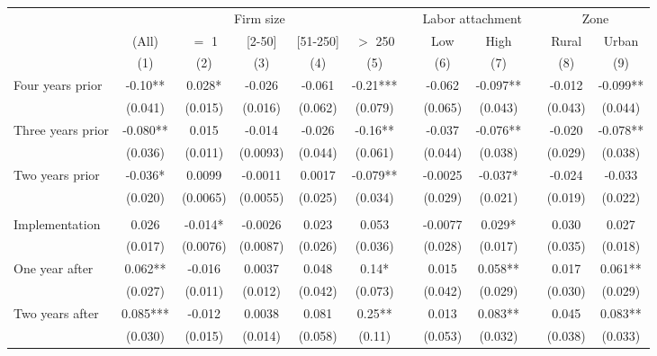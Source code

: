 \begin{tabular}{lccccccccccc}
\toprule
      & \multicolumn{5}{c}{Firm size}         &       & \multicolumn{2}{c}{Labor attachment} &       & \multicolumn{2}{c}{Zone} \\
\cmidrule{2-6}\cmidrule{8-9}\cmidrule{11-12}      & (All) & $=$ 1 & [2-50] & [51-250] & $>$ 250 &       & Low   & High  &       & Rural & Urban \\
\midrule
      & (1)   & (2)   & (3)   & (4)   & (5)   &       & (6)   & (7)   &       & (8)   & (9) \\
\midrule
\midrule
Four years prior & -0.10** & 0.028* & -0.026 & -0.061 & -0.21*** &       & -0.062 & -0.097** &       & -0.012 & -0.099** \\
      & (0.041) & (0.015) & (0.016) & (0.062) & (0.079) &       & (0.065) & (0.043) &       & (0.043) & (0.044) \\
Three years prior & -0.080** & 0.015 & -0.014 & -0.026 & -0.16** &       & -0.037 & -0.076** &       & -0.020 & -0.078** \\
      & (0.036) & (0.011) & (0.0093) & (0.044) & (0.061) &       & (0.044) & (0.038) &       & (0.029) & (0.038) \\
Two years prior & -0.036* & 0.0099 & -0.0011 & 0.0017 & -0.079** &       & -0.0025 & -0.037* &       & -0.024 & -0.033 \\
      & (0.020) & (0.0065) & (0.0055) & (0.025) & (0.034) &       & (0.029) & (0.021) &       & (0.019) & (0.022) \\
      &       &       &       &       &       &       &       &       &       &       &  \\
Implementation & 0.026 & -0.014* & -0.0026 & 0.023 & 0.053 &       & -0.0077 & 0.029* &       & 0.030 & 0.027 \\
      & (0.017) & (0.0076) & (0.0087) & (0.026) & (0.036) &       & (0.028) & (0.017) &       & (0.035) & (0.018) \\
One year after & 0.062** & -0.016 & 0.0037 & 0.048 & 0.14* &       & 0.015 & 0.058** &       & 0.017 & 0.061** \\
      & (0.027) & (0.011) & (0.012) & (0.042) & (0.073) &       & (0.042) & (0.029) &       & (0.030) & (0.029) \\
Two years after & 0.085*** & -0.012 & 0.0038 & 0.081 & 0.25** &       & 0.013 & 0.083** &       & 0.045 & 0.083** \\
      & (0.030) & (0.015) & (0.014) & (0.058) & (0.11) &       & (0.053) & (0.032) &       & (0.038) & (0.033) \\

\end{tabular}
